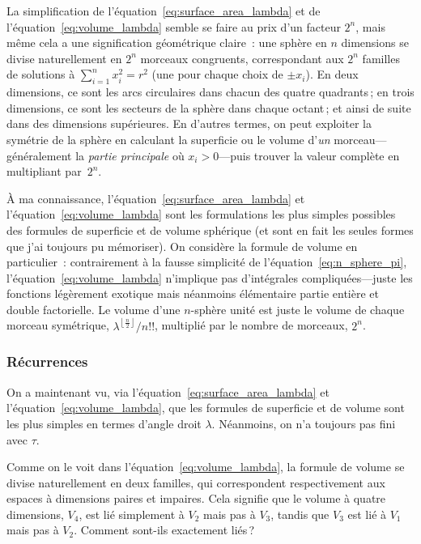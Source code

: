 La simplification de l'équation~\eqref{eq:surface_area_lambda} et de l'équation~\eqref{eq:volume_lambda} semble se faire au prix d'un facteur $2^n$, mais même cela a une signification géométrique claire~: une sphère en $n$ dimensions se divise naturellement en $2^n$ morceaux congruents, correspondant aux $2^n$ familles de solutions à $\sum_{i=1}^{n} x_i^2 = r^2$ (une pour chaque choix de $\pm x_i$). En deux dimensions, ce sont les arcs circulaires dans chacun des quatre quadrants\,; en trois dimensions, ce sont les secteurs de la sphère dans chaque octant\,; et ainsi de suite dans des dimensions supérieures. En d'autres termes, on peut exploiter la symétrie de la sphère en calculant la superficie ou le volume d'\emph{un} morceau---généralement la \emph{partie principale} où $x_i > 0$---puis trouver la valeur complète en multipliant par~$2^n$.

À ma connaissance, l'équation~\eqref{eq:surface_area_lambda} et l'équation~\eqref{eq:volume_lambda} sont les formulations les plus simples possibles des formules de superficie et de volume sphérique (et sont en fait les seules formes que j'ai toujours pu mémoriser). On considère la formule de volume en particulier~: contrairement à la fausse simplicité de l'équation~\eqref{eq:n_sphere_pi}, l'équation~\eqref{eq:volume_lambda} n'implique pas d'intégrales compliquées---juste les fonctions légèrement exotique mais néanmoins élémentaire partie entière et double factorielle. Le volume d'une $n$-sphère unité est juste le volume de chaque morceau symétrique, $\lambda^{\left\lfloor \frac{n}{2} \right\rfloor}/n!!$, multiplié par le nombre de morceaux, $2^n$.


\subsubsection{Récurrences} %
\label{sec:recurrences}

On a maintenant vu, via l'équation~\eqref{eq:surface_area_lambda} et l'équation~\eqref{eq:volume_lambda}, que les formules de superficie et de volume sont les plus simples en termes d'angle droit $\lambda$. Néanmoins, on n'a toujours pas fini avec $\tau$.

Comme on le voit dans l'équation~\eqref{eq:volume_lambda}, la formule de volume se divise naturellement en deux familles, qui correspondent respectivement aux espaces à dimensions paires et impaires. Cela signifie que le volume à quatre dimensions, $V_4$, est lié simplement à $V_2$ mais pas à $V_3$, tandis que $V_3$ est lié à $V_1$ mais pas à $V_2$. Comment sont-ils exactement liés\,?

